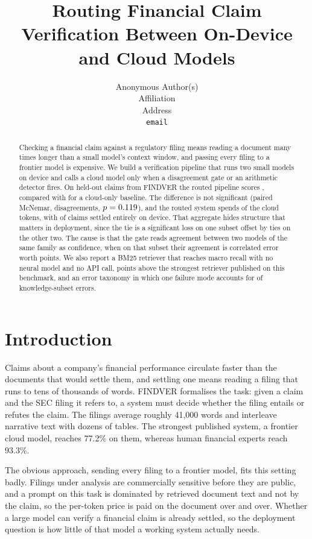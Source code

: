 \documentclass{article}
\title{Routing Financial Claim Verification Between On-Device and Cloud Models}
\author{%
  Anonymous Author(s) \\
  Affiliation \\
  Address \\
  \texttt{email} \\
}
\begin{document}
\maketitle

\begin{abstract}
Checking a financial claim against a regulatory filing means reading a document many times
longer than a small model's context window, and passing every filing to a frontier model is
expensive. We build a verification pipeline that runs two small models on device and calls a
cloud model only when a disagreement gate or an arithmetic detector fires. On \nTest{}
held-out claims from FINDVER the routed pipeline scores \accRouted{}, compared with
\accCloud{} for a cloud-only baseline. The difference is not significant (paired McNemar,
\mcnemarAllDisagree{} disagreements, $p = 0.119{}$), and the routed system spends
\costRatio{} of the cloud tokens, with \onDeviceRate{} of claims settled entirely on device.
That aggregate hides structure that matters in deployment, since the tie is a significant
loss on one subset offset by ties on the other two. The cause is that the gate reads
agreement between two models of the same family as confidence, when on that subset their
agreement is correlated error worth \keptLocalIEGap{} points. We also report a BM25
retriever that reaches \recallOursTest{} macro recall with no neural model and no API call,
\recallGainTest{} points above the strongest retriever published on this benchmark, and an
error taxonomy in which one failure mode accounts for \missingInfoKnowTest{} of
knowledge-subset errors.
\end{abstract}

\section{Introduction}
\label{sec:intro}

Claims about a company's financial performance circulate faster than the documents that
would settle them, and settling one means reading a filing that runs to tens of thousands of
words. FINDVER \citep{zhao2024findver} formalises the task: given a claim and the SEC filing
it refers to, a system must decide whether the filing entails or refutes the claim. The
filings average roughly 41,000 words and interleave narrative text with dozens of tables.
The strongest published system, a frontier cloud model, reaches 77.2\% on them, whereas
human financial experts reach 93.3\%.

The obvious approach, sending every filing to a frontier model, fits this setting badly.
Filings under analysis are commercially sensitive before they are public, and a prompt on
this task is dominated by retrieved document text and not by the claim, so the per-token
price is paid on the document over and over. Whether a large model can verify a financial
claim is already settled, so the deployment question is how little of that model a working
system actually needs.
\end{document}
